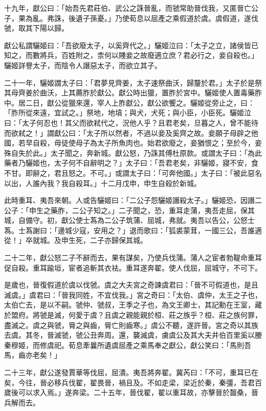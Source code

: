 \begin{pinyinscope}
十九年，獻公曰：「始吾先君莊伯、武公之誅晉亂，而虢常助晉伐我，又匿晉亡公子，果為亂。弗誅，後遺子孫憂。」乃使荀息以屈產之乘假道於虞。虞假道，遂伐虢，取其下陽以歸。

獻公私謂驪姬曰：「吾欲廢太子，以奚齊代之。」驪姬泣曰：「太子之立，諸侯皆已知之，而數將兵，百姓附之，柰何以賤妾之故廢適立庶？君必行之，妾自殺也。」驪姬詳譽太子，而陰令人譖惡太子，而欲立其子。

二十一年，驪姬謂太子曰：「君夢見齊姜，太子速祭曲沃，歸釐於君。」太子於是祭其母齊姜於曲沃，上其薦胙於獻公。獻公時出獵，置胙於宮中。驪姬使人置毒藥胙中。居二日，獻公從獵來還，宰人上胙獻公，獻公欲饗之。驪姬從旁止之，曰：「胙所從來遠，宜試之。」祭地，地墳；與犬，犬死；與小臣，小臣死。驪姬泣曰：「太子何忍也！其父而欲弒代之，況他人乎？且君老矣，旦暮之人，曾不能待而欲弒之！」謂獻公曰：「太子所以然者，不過以妾及奚齊之故。妾願子母辟之他國，若早自殺，毋徒使母子為太子所魚肉也。始君欲廢之，妾猶恨之；至於今，妾殊自失於此。」太子聞之，奔新城。獻公怒，乃誅其傅杜原款。或謂太子曰：「為此藥者乃驪姬也，太子何不自辭明之？」太子曰：「吾君老矣，非驪姬，寢不安，食不甘。即辭之，君且怒之。不可。」或謂太子曰：「可奔他國。」太子曰：「被此惡名以出，人誰內我？我自殺耳。」十二月戊申，申生自殺於新城。

此時重耳、夷吾來朝。人或告驪姬曰：「二公子怨驪姬譖殺太子。」驪姬恐，因譖二公子：「申生之藥胙，二公子知之。」二子聞之，恐，重耳走蒲，夷吾走屈，保其城，自備守。初，獻公使士蒍為二公子筑蒲、屈城，弗就。夷吾以告公，公怒士蒍。士蒍謝曰：「邊城少寇，安用之？」退而歌曰：「狐裘蒙茸，一國三公，吾誰適從！」卒就城。及申生死，二子亦歸保其城。

二十二年，獻公怒二子不辭而去，果有謀矣，乃使兵伐蒲。蒲人之宦者勃鞮命重耳促自殺。重耳踰垣，宦者追斬其衣袪。重耳遂奔翟。使人伐屈，屈城守，不可下。

是歲也，晉復假道於虞以伐虢。虞之大夫宮之奇諫虞君曰：「晉不可假道也，是且滅虞。」虞君曰：「晉我同姓，不宜伐我。」宮之奇曰：「太伯、虞仲，太王之子也，太伯亡去，是以不嗣。虢仲、虢叔，王季之子也，為文王卿士，其記勳在王室，藏於盟府。將虢是滅，何愛于虞？且虞之親能親於桓、莊之族乎？桓、莊之族何罪，盡滅之。虞之與虢，脣之與齒，脣亡則齒寒。」虞公不聽，遂許晉。宮之奇以其族去虞。其冬，晉滅虢，虢公丑奔周。還，襲滅虞，虜虞公及其大夫井伯百里奚以媵秦穆姬，而修虞祀。荀息牽曩所遺虞屈產之乘馬奉之獻公，獻公笑曰：「馬則吾馬，齒亦老矣！」

二十三年，獻公遂發賈華等伐屈，屈潰。夷吾將奔翟。冀芮曰：「不可，重耳已在矣，今往，晉必移兵伐翟，翟畏晉，禍且及。不如走梁，梁近於秦，秦彊，吾君百歲後可以求入焉。」遂奔梁。二十五年，晉伐翟，翟以重耳故，亦擊晉於齧桑，晉兵解而去。


\end{pinyinscope}
